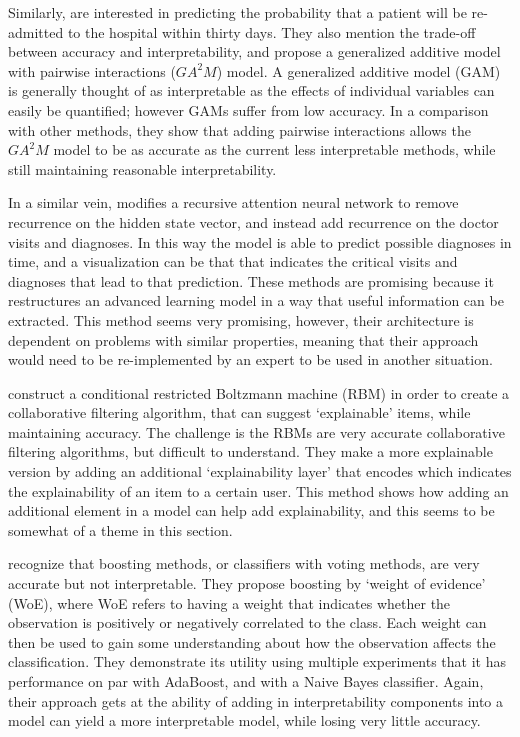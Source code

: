     Similarly, \citet{Caruana2015-za} are interested in predicting the probability that a patient will be re-admitted to the hospital within thirty days. They also mention the trade-off between accuracy and interpretability, and propose a generalized additive model with pairwise interactions ($GA^2M$) model. A generalized additive model (GAM) is generally thought of as interpretable as the effects of individual variables can easily be quantified; however GAMs suffer from low accuracy. In a comparison with other methods, they show that adding pairwise interactions allows the $GA^2M$ model to be as accurate as the current less interpretable methods, while still maintaining reasonable interpretability.

    In a similar vein, \citet{Choi2016-by} modifies a recursive attention neural network to remove recurrence on the hidden state vector, and instead add recurrence on the doctor visits and diagnoses. In this way the model is able to predict possible diagnoses in time, and a visualization can be that that indicates the critical visits and diagnoses that lead to that prediction. These methods are promising because it restructures an advanced learning model in a way that useful information can be extracted. This method seems very promising, however, their architecture is dependent on problems with similar properties, meaning that their approach would need to be re-implemented by an expert to be used in another situation.

    \citet{Abdollahi2016-vn} construct a conditional restricted Boltzmann machine (RBM) in order to create a collaborative filtering algorithm, that can suggest `explainable' items, while maintaining accuracy. The challenge is the RBMs are very accurate collaborative filtering algorithms, but difficult to understand. They make a more explainable version by adding an additional `explainability layer' that encodes which indicates the explainability of an item to a certain user. This method shows how adding an additional element in a model can help add explainability, and this seems to be somewhat of a theme in this section.

    \citet{Ridgeway1998-lv} recognize that boosting methods, or classifiers with voting methods, are very accurate but not interpretable. They propose boosting by `weight of evidence' (WoE), where WoE refers to having a weight that indicates whether the observation is positively or negatively correlated to the class. Each weight can then be used to gain some understanding about how the observation affects the classification. They demonstrate its utility using multiple experiments that it has performance on par with AdaBoost, and with a Naive Bayes classifier.  Again, their approach gets at the ability of adding in interpretability components into a model can yield a more interpretable model, while losing very little accuracy.

